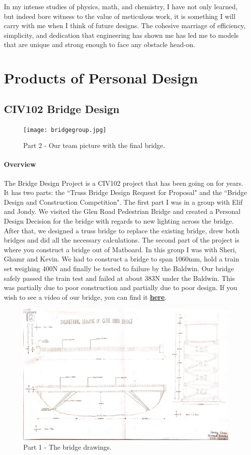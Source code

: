 \documentclass[paper=a4, fontsize=11pt]{article} %
\begin{document}
In my intense studies of physics, math, and chemistry, I have not only learned, but indeed bore witness to the value of meticulous work, it is something I will carry with me when I think of future designs.  The cohesive marriage of efficiency, simplicity, and dedication that engineering has shown me has led me to models that are unique and strong enough to face any obstacle head-on.
 
 
\section{Products of Personal Design}
    \subsection{CIV102 Bridge Design}
        \begin{figure}[H]
            \centering
            \texttt{[image: bridgegroup.jpg]}
            \caption{Part 2 - Our team picture with the final bridge.}
        \end{figure}
        \paragraph{Overview}
        The Bridge Design Project is a CIV102 project that has been going on for years. It has two parts: the ``Truss Bridge Design Request for Proposal" and the ``Bridge Design and Construction Competition". The first part I was in a group with Elif and Jondy. We visited the Glen Road Pedestrian Bridge and created a Personal Design Decision for the bridge with regards to new lighting across the bridge. After that, we designed a truss bridge to replace the existing bridge, drew both bridges and did all the necessary calculations.
        \newline
        The second part of the project is where you construct a bridge out of Matboard. In this group I was with Sheri, Ghamr and Kevin. We had to construct a bridge to span 1060mm, hold a train set weighing 400N and finally be tested to failure by the Baldwin. Our bridge safely passed the train test and failed at about 383N under the Baldwin. This was partially due to poor construction and partially due to poor design. If you wish to see a video of our bridge, you can find it \href{https://youtu.be/qZL1Y6M1oTY}{\textbf{here}}.
        \begin{figure}[H]
            \centering
            \includegraphics[width=0.7\linewidth]{drawing.jpg}
            \caption{Part 1 - The bridge drawings.}
        \end{figure}
\end{document}
